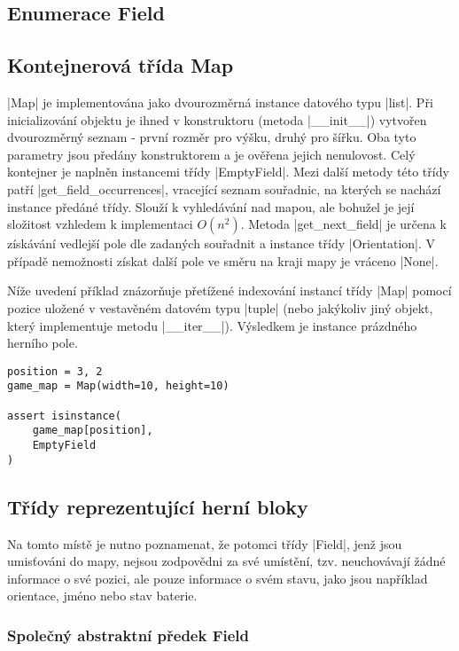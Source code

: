 \subsection{Enumerace Field}


\subsection{Kontejnerová třída Map}

\ic|Map| je implementována jako dvourozměrná instance datového typu \ic|list|. Při inicializování objektu je ihned v konstruktoru (metoda \ic|__init__|) vytvořen dvourozměrný seznam - první rozměr pro výšku, druhý pro šířku. Oba tyto parametry jsou předány konstruktorem a je ověřena jejich nenulovost. Celý kontejner je naplněn instancemi třídy \ic|EmptyField|. Mezi další metody této třídy patří \ic|get_field_occurrences|, vracející seznam souřadnic, na kterých se nachází instance předáné třídy. Slouží k vyhledávání nad mapou, ale bohužel je její složitost vzhledem k implementaci $O(n^2)$. Metoda \ic|get_next_field| je určena k získávání vedlejší pole dle zadaných souřadnit a instance třídy \ic|Orientation|. V případě nemožnosti získat další pole ve směru na kraji mapy je vráceno \ic|None|. 

Níže uvedení příklad znázorňuje přetížené indexování instancí třídy \ic|Map| pomocí pozice uložené v vestavěném datovém typu \ic|tuple| (nebo jakýkoliv jiný objekt, který implementuje metodu \ic|__iter__|). Výsledkem je instance prázdného herního pole.

\begin{lstlisting}[caption={Přetížené indexování třídy Map}]
position = 3, 2
game_map = Map(width=10, height=10)

assert isinstance(
	game_map[position],
	EmptyField
)
\end{lstlisting}

\subsection{Třídy reprezentující herní bloky}

Na tomto místě je nutno poznamenat, že potomci třídy \ic|Field|, jenž jsou umisťováni do mapy, nejsou zodpovědni za své umístění, tzv. neuchovávají žádné informace o své pozici, ale pouze informace o svém stavu, jako jsou například orientace, jméno nebo stav baterie. 

\subsubsection{Společný abstraktní předek Field}

